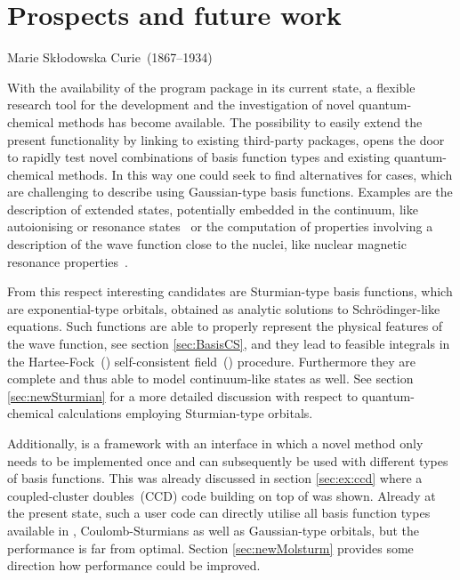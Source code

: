 \chapter{Prospects and future work}
\label{ch:Prospects}
{Marie Skłodowska Curie~(1867--1934)}

\noindent
With the availability of the \molsturm program package in its
current state, a flexible research tool
for the development and the investigation of novel quantum-chemical methods
has become available.
The possibility to easily extend the present functionality
by linking to existing third-party packages,
opens the door to rapidly test novel combinations of basis function types
and existing quantum-chemical methods.
In this way one could seek to find alternatives for cases,
which are challenging to describe using Gaussian-type basis functions.
Examples are the description of extended states,
potentially embedded in the continuum,
like autoionising or resonance states~\cite{Feshbach1958,Feshbach1962,Riss1993,Santra2002}
or the computation of properties involving a description
of the wave function close to the nuclei,
like nuclear magnetic resonance properties~\cite{Guell2008,Hoggan2009}.

From this respect interesting candidates are Sturmian-type basis functions,
which are exponential-type orbitals,
obtained as analytic solutions to Schrödinger-like equations.
Such functions are able to properly represent
the physical features of the wave function,
see section \ref{sec:BasisCS},
and they lead to feasible integrals
in the Hartee-Fock~(\HF) self-consistent field~(\SCF) procedure.
Furthermore they are complete
and thus able to model continuum-like states as well.
See section \ref{sec:newSturmian} for a more
detailed discussion with respect to
quantum-chemical calculations employing Sturmian-type orbitals.

Additionally, \molsturm is a framework with an interface
in which a novel method only needs to be implemented
once and can subsequently be
used with different types of basis functions.
This was already discussed in section \ref{sec:ex:ccd}
where a coupled-cluster doubles~(CCD) code building on top of \molsturm was shown.
Already at the present state, such a user code can
directly utilise all basis function types available in \molsturm,
\ie Coulomb-Sturmians as well as Gaussian-type orbitals,
but the performance is far from optimal.
Section \ref{sec:newMolsturm} provides some direction
how performance could be improved.

